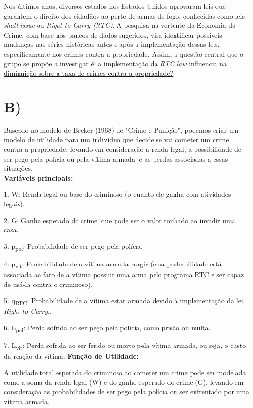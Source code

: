 \documentclass[12pt]{article}
\begin{document}
Nos últimos anos, diversos estados nos Estados Unidos aprovaram leis que
garantem o direito dos cidadãos ao porte de armas de fogo, conhecidas
como leis \emph{shall-issue} ou \emph{Right-to-Carry (RTC)}. A pesquisa
na vertente da Economia do Crime, com base nos bancos de dados
sugeridos, visa identificar possíveis mudanças nas séries históricas
antes e após a implementação dessas leis, especificamente nos crimes
contra a propriedade. Assim, a questão central que o grupo se propõe a
investigar é: \uline{a implementação da \emph{RTC law} influencia na
diminuição sobre a taxa de crimes contra a propriedade?}

    \vspace*{1cm}

\section*{B)}


Baseado no modelo de Becker (1968) de "Crime e Punição", podemos
criar um modelo de utilidade para um indivíduo que decide se vai cometer
um crime contra a propriedade, levando em consideração a renda legal, a
possibilidade de ser pego pela polícia ou pela vítima armada, e as
perdas associadas a essas situações.\\

\textbf{Variáveis principais:}

1. W: Renda legal ou base do criminoso (o quanto ele ganha com
atividades legais).

2. G: Ganho esperado do crime, que pode ser o valor roubado ao invadir
uma casa.

3. p\textsubscript{pol}: Probabilidade de ser pego pela polícia.

4. p\textsubscript{vit}: Probabilidade de a vítima armada reagir (essa
probabilidade está associada ao fato de a vítima possuir uma arma pelo
programa RTC e ser capaz de usá-la contra o criminoso).

5. q\textsubscript{RTC}: Probabilidade de a vítima estar armada devido à
implementação da lei \emph{Right-to-Carry}..

6. L\textsubscript{pol}: Perda sofrida ao ser pego pela polícia, como
prisão ou multa.

7. L\textsubscript{vit}: Perda sofrida ao ser ferido ou morto pela
vítima armada, ou seja, o custo da reação da vítima.
\newpage
\textbf{Função de Utilidade:}

A utilidade total esperada do criminoso ao cometer um crime pode ser
modelada como a soma da renda legal (W) e do ganho esperado do crime
(G), levando em consideração as probabilidades de ser pego pela polícia
ou ser enfrentado por uma vítima armada.
\end{document}
